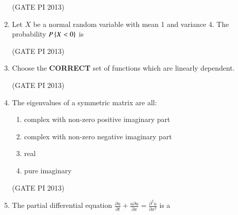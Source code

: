 \documentclass[journal,12pt,onecolumn]{IEEEtran}
\theoremstyle{remark}
\begin{document}
\begin{enumerate}
\hfill (GATE PI 2013)

\item Let $X$ be a normal random variable with mean 1 and variance 4. The probability $P\left\{X<0\right\}$ is 
\begin{enumerate}
\end{enumerate}

\hfill (GATE PI 2013)

\item Choose the \textbf{CORRECT} set of functions which are linearly dependent. 
\begin{enumerate}
\end{enumerate}

\hfill (GATE PI 2013)

\item The eigenvalues of a symmetric matrix are all:
\begin{enumerate}
\item complex with non-zero positive imaginary part 
\item complex with non-zero negative imaginary part 
\item real
\item pure imaginary 
\end{enumerate} 

\hfill (GATE PI 2013)
\newpage
\item The partial differential equation 
$ \frac{\partial u}{\partial t} + \frac{u \partial u }{\partial x}=\frac{\partial^2 u}{\partial x^2} $
is a
\begin{enumerate}
\end{enumerate}


\end{enumerate}
\end{document}
